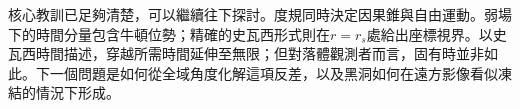 \begin{classroomqa}
\end{classroomqa}

核心教訓已足夠清楚，可以繼續往下探討。度規同時決定因果錐與自由運動。弱場下的時間分量包含牛頓位勢；精確的史瓦西形式則在\(r=r_s\)處給出座標視界。以史瓦西時間描述，穿越所需時間延伸至無限；但對落體觀測者而言，固有時並非如此。下一個問題是如何從全域角度化解這項反差，以及黑洞如何在遠方影像看似凍結的情況下形成。